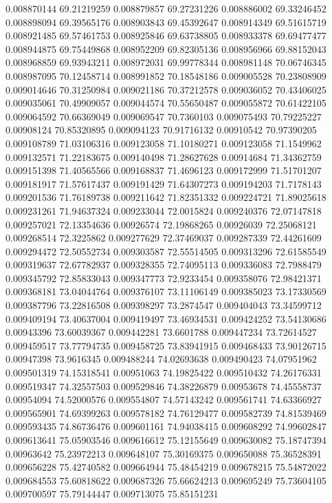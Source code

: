0.008870144	69.21219259
0.008879857	69.27231226
0.008886002	69.33246452
0.008898094	69.39565176
0.008903843	69.45392647
0.008914349	69.51615719
0.008921485	69.57461753
0.008925846	69.63738805
0.008933378	69.69477477
0.008944875	69.75449868
0.008952209	69.82305136
0.008956966	69.88152043
0.008968859	69.93943211
0.008972031	69.99778344
0.008981148	70.06746345
0.008987095	70.12458714
0.008991852	70.18548186
0.009005528	70.23808909
0.009014646	70.31250984
0.009021186	70.37212578
0.009036052	70.43406025
0.009035061	70.49909057
0.009044574	70.55650487
0.009055872	70.61422105
0.009064592	70.66369049
0.009069547	70.7360103
0.009075493	70.79225227
0.00908124	70.85320895
0.009094123	70.91716132
0.00910542	70.97390205
0.009108789	71.03106316
0.009123058	71.10180271
0.009123058	71.1549962
0.009132571	71.22183675
0.009140498	71.28627628
0.00914684	71.34362759
0.009151398	71.40565566
0.009168837	71.4696123
0.009172999	71.51701207
0.009181917	71.57617437
0.009191429	71.64307273
0.009194203	71.7178143
0.009201536	71.76189738
0.009211642	71.82351332
0.009224721	71.89025618
0.009231261	71.94637324
0.009233044	72.0015824
0.009240376	72.07147818
0.009257021	72.13354636
0.00926574	72.19868265
0.00926039	72.25068121
0.009268514	72.3225862
0.009277629	72.37469037
0.009287339	72.44261609
0.009294472	72.50552734
0.009303587	72.55514505
0.009313296	72.61585549
0.009319637	72.67782937
0.009328355	72.74095113
0.009336083	72.7988479
0.009345792	72.85833043
0.009347773	72.9233454
0.009358076	72.98421371
0.009368181	73.04044764
0.009376107	73.11106149
0.009385023	73.17330569
0.009387796	73.22816508
0.009398297	73.2874547
0.009404043	73.34599712
0.009409194	73.40637004
0.009419497	73.46934531
0.009424252	73.54130686
0.00943396	73.60039367
0.009442281	73.6601788
0.009447234	73.72614527
0.009459517	73.77794735
0.009458725	73.83941915
0.009468433	73.90126715
0.00947398	73.9616345
0.009488244	74.02693638
0.009490423	74.07951962
0.009501319	74.15318541
0.00951063	74.19825422
0.009510432	74.26176331
0.009519347	74.32557503
0.009529846	74.38226879
0.00953678	74.45558737
0.00954094	74.52000576
0.009554807	74.57143242
0.009561741	74.63366927
0.009565901	74.69399263
0.009578182	74.76129477
0.009582739	74.81539469
0.009593435	74.86736476
0.009601161	74.94038415
0.009608292	74.99602847
0.009613641	75.05903546
0.009616612	75.12155649
0.009630082	75.18747394
0.00963642	75.23972213
0.009648107	75.30169375
0.009650088	75.36528391
0.009656228	75.42740582
0.009664944	75.48454219
0.009678215	75.54872022
0.009684553	75.60818622
0.009687326	75.66624213
0.009695249	75.73604105
0.009700597	75.79144447
0.009713075	75.85151231
